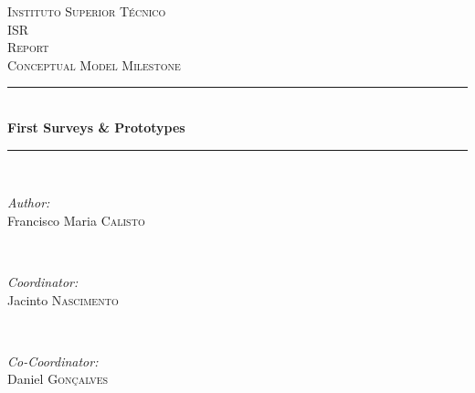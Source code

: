 \begin{titlepage}

\newcommand{\HRule}{\rule{\linewidth}{0.5mm}} %

\center %
 

\textsc{\LARGE Instituto Superior T\'{e}cnico}\\[1.5cm]
\textsc{\Large ISR}\\[0.5cm]
\textsc{\large Report}\\[0.25cm]
\textsc{\small Conceptual Model Milestone}\\[0.25cm]


\HRule \\[0.5cm]
{ \large \bfseries First Surveys \& Prototypes}\\[0.25cm] %
\HRule \\[0.5cm]
 

\begin{minipage}{0.4\textwidth}
\begin{flushleft} \large
\emph{Author:}\\
Francisco Maria \textsc{Calisto} %
\end{flushleft}
\end{minipage}
~
\begin{minipage}{0.4\textwidth}
\begin{flushright} \large
\emph{Coordinator:} \\
Jacinto \textsc{Nascimento} %
\end{flushright}
~
\begin{flushright} \large
\emph{Co-Coordinator:} \\
Daniel \textsc{Gon\c{c}alves} %
\end{flushright}
\end{minipage}\\[2cm]


\end{titlepage}
